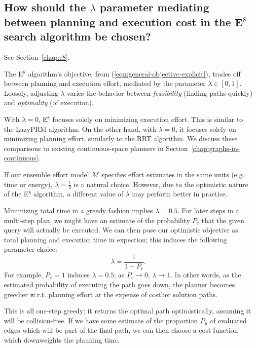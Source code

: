 {
\renewcommand\thesubsection{Q\arabic{subsection}}

\subsection{How should the $\lambda$ parameter mediating
   between planning and execution cost in the E$^8$
   search algorithm be chosen?}
\label{ques:choosing-lambda}

See Section~\ref{chap:e8}.

The E$^8$ algorithm's objective,
from (\ref{eqn:general-objective-explicit}),
trades off between planning and execution effort,
mediated by the parameter $\lambda \in [0,1]$.
Loosely,
adjusting $\lambda$ varies the behavior between
\emph{feasibility} (finding paths quickly)
and \emph{optimality} (of execution).

With $\lambda=0$,
E$^8$ focuses solely on minimizing execution effort.
This is similar to the LazyPRM algorithm.
On the other hand,
with $\lambda=0$,
it focuses solely on minimizing planning effort,
similarly to the RRT algorithm.
We discuss these comparisons to existing continuous-space planners
in Section~\ref{chap:graphs-in-continuous}.

If our ensemble effort model $\mathcal{M}$
specifies effort estimates in the same units
(e.g. time or energy),
$\lambda=\frac{1}{2}$ is a natural choice.
However,
due to the optimistic nature of the E$^8$ algorithm,
a different value of $\lambda$ may perform better in practice.

Minimizing total time in a greedy fashion implies $\lambda = 0.5$.
For later steps in a multi-step plan,
we might have an estimate of the probability $P_e$ that the given query will
actually be executed.
We can then pose our optimistic objective as total planning and execution
time in expection;
this induces the following parameter choice:
\begin{equation}
   \lambda = \frac{1}{1 + P_e} .
\end{equation}
For example, $P_e=1$ induces $\lambda = 0.5$;
as $P_e \rightarrow 0$, $\lambda \rightarrow 1$.
In other words,
as the estimated probability of executing the path goes down,
the planner becomes greedier w.r.t. planning effort at the expense of
costlier solution paths.

This is all one-step greedy;
it returns the optimal path optimistically,
assuming it will be collision-free.
If we have some estimate of the proportion $P_u$ of evaluated edges
which will be part of the final path,
we can then choose a cost function which downweights the planning time.

}
